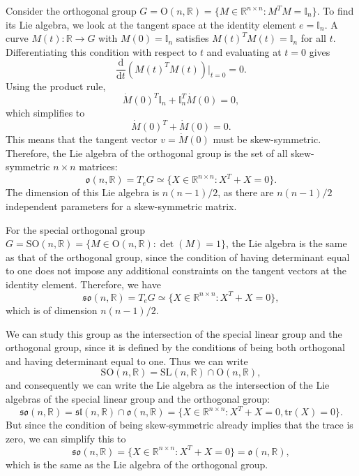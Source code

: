 \begin{example}
    Consider the orthogonal group \(G = \mathrm{O}(n, \mathbb{R}) = \{M \in \mathbb{R}^{n \times n} : M^T M = \mathbb{I}_n\}\). To find its Lie algebra, we look at the tangent space at the identity element \(e = \mathbb{I}_n\). A curve \(M(t) : \mathbb{R} \to G\) with \(M(0) = \mathbb{I}_n\) satisfies \(M(t)^T M(t) = \mathbb{I}_n\) for all \(t\). Differentiating this condition with respect to \(t\) and evaluating at \(t = 0\) gives
    \[
        \frac{\mathrm{d}}{\mathrm{d} t} (M(t)^T M(t)) \bigg|_{t=0} = 0.
    \]
    Using the product rule,
    \[
        \dot{M}(0)^T \mathbb{I}_n + \mathbb{I}_n^T \dot{M}(0) = 0,
    \]
    which simplifies to
    \[
        \dot{M}(0)^T + \dot{M}(0) = 0.
    \]
    This means that the tangent vector \(v = \dot{M}(0)\) must be skew-symmetric. Therefore, the Lie algebra of the orthogonal group is the set of all skew-symmetric \(n \times n\) matrices:
    \[
        \mathfrak{o}(n, \mathbb{R}) = T_e G \simeq \{X \in \mathbb{R}^{n \times n} : X^T + X = 0\}.
    \]
    The dimension of this Lie algebra is \(n(n-1)/2\), as there are \(n(n-1)/2\) independent parameters for a skew-symmetric matrix.
\end{example}

\begin{example}
    For the special orthogonal group \(G = \mathrm{SO}(n, \mathbb{R}) = \{M \in \mathrm{O}(n, \mathbb{R}) : \det(M) = 1\}\), the Lie algebra is the same as that of the orthogonal group, since the condition of having determinant equal to one does not impose any additional constraints on the tangent vectors at the identity element. Therefore, we have
    \[
        \mathfrak{so}(n, \mathbb{R}) = T_e G \simeq \{X \in \mathbb{R}^{n \times n} : X^T + X = 0\},
    \]
    which is of dimension \(n(n-1)/2\).

    We can study this group as the intersection of the special linear group and the orthogonal group, since it is defined by the conditions of being both orthogonal and having determinant equal to one. Thus we can write
    \[
        \mathrm{SO}(n, \mathbb{R}) = \mathrm{SL}(n, \mathbb{R}) \cap \mathrm{O}(n, \mathbb{R}),
    \]
    and consequently we can write the Lie algebra as the intersection of the Lie algebras of the special linear group and the orthogonal group:
    \[
        \mathfrak{so}(n, \mathbb{R}) = \mathfrak{sl}(n, \mathbb{R}) \cap \mathfrak{o}(n, \mathbb{R}) = \{X \in \mathbb{R}^{n \times n} : X^T + X = 0, \mathrm{tr}(X) = 0\}.
    \]
    But since the condition of being skew-symmetric already implies that the trace is zero, we can simplify this to
    \[
        \mathfrak{so}(n, \mathbb{R}) = \{X \in \mathbb{R}^{n \times n} : X^T + X = 0\} = \mathfrak{o}(n, \mathbb{R}),
    \]
    which is the same as the Lie algebra of the orthogonal group.
\end{example}

